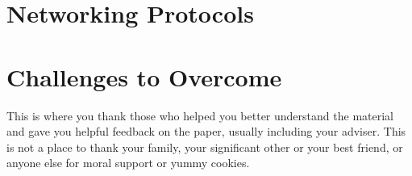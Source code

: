 \documentclass[sigplan,screen,nonacm]{acmart}
\begin{document}
\section{Networking Protocols}
\label{sec:Networking Protocols}

\section{Challenges to Overcome}
\label{sec:Challenges to Overcome}


\begin{acks}
This is where you thank those who helped you better understand the material 
and gave you helpful feedback on the paper, usually including your adviser. 
This is not a place to thank your family, your significant other or your best friend, 
or anyone else  for moral support or yummy cookies. 
\end{acks}



\end{document}
